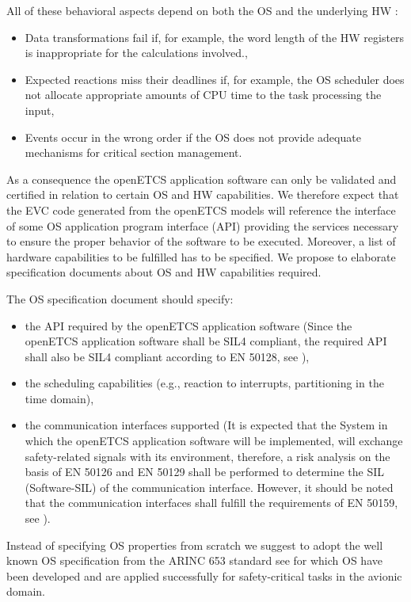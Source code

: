 \documentclass{template/openetcs_report}
\begin{document}
All of these behavioral aspects depend on both the OS and the underlying HW \cite{BraPeFe12}:
\begin{itemize}\itemsep=0pt
  \item Data transformations fail if, for example, the word length of the HW registers is inappropriate for the calculations involved.,
  \item Expected reactions miss their deadlines if, for example, the OS scheduler does not allocate appropriate amounts of CPU time to the task processing the input,
  \item Events occur in the wrong order if the OS does not provide adequate mechanisms for critical section management.
\end{itemize}

As a consequence the openETCS application software can only be validated and certified in relation to certain OS and HW capabilities.
We therefore expect that the EVC code generated from the openETCS models will reference the interface of some OS application program interface (API) providing the services necessary to ensure the proper behavior of the software to be executed. Moreover, a list of hardware capabilities to be fulfilled has to be specified. 
We propose to elaborate specification documents about OS and HW capabilities required. 

The OS specification document should specify:
\begin{itemize}\itemsep=0pt
  \item the API required by the openETCS application software (Since the openETCS application software shall be SIL4 compliant, the required API shall also be SIL4 compliant according to EN 50128, see \cite{EN50128}),
  \item the scheduling capabilities (e.g., reaction to interrupts, partitioning in the time domain),
  \item the communication interfaces supported (It is expected that the System in which the openETCS application software will be implemented, will exchange safety-related signals with its environment, therefore, a risk analysis on the basis of EN 50126 and EN 50129 shall be performed to determine the SIL (Software-SIL) of the communication interface. However, it should be noted that the communication interfaces shall fulfill the requirements of EN 50159, see \cite{EN50159}).
\end{itemize}

Instead of specifying OS properties from scratch we suggest to adopt the well known OS specification from the ARINC 653 standard see \cite{ARINC} for which OS have been developed and are applied successfully for safety-critical tasks in the avionic domain.
\end{document}
